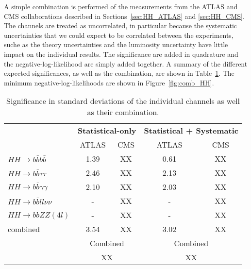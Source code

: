 A simple combination is performed of the measurements from the ATLAS and CMS collaborations described in Sections~\ref{sec:HH_ATLAS} and \ref{sec:HH_CMS}.
The channels are treated as uncorrelated, in particular because the systematic uncertainties that we could expect to be correlated between the experiments, suche as the theory uncertainties and the luminosity uncertainty have little impact on the individual results.
The significance are added in quadrature and the negative-log-likelihood are simply added together. A summary of the different expected significances, as well as the combination, are shown in Table~\ref{tab:comb_significance}. The minimum negative-log-likelihoods are shown in Figure~\ref{fig:comb_HH}.

\begin{table}[htb!]
\begin{center}
\begin{tabular}{lcccc} \toprule
 & \multicolumn{2}{c}{\textbf{Statistical-only}} & \multicolumn{2}{c}{\textbf{Statistical + Systematic}}\\
 & ATLAS & CMS & ATLAS & CMS \\
\hline
$HH \rightarrow b\bar{b}b\bar{b}$ & 1.39 & XX & 0.61 & XX \\
$HH \rightarrow b\bar{b}\tau\tau$ & 2.46 & XX & 2.13 & XX \\
$HH \rightarrow b\bar{b}\gamma\gamma$ & 2.10 & XX & 2.03 & XX \\
$HH \rightarrow b\bar{b}ll\nu\nu$ & - & XX & - & XX \\
$HH \rightarrow b\bar{b}ZZ(4l)$ & - & XX & - & XX \\
combined &  3.54 & XX & 3.02 & XX \\
\hline
 &  \multicolumn{2}{c}{Combined} & \multicolumn{2}{c}{Combined}\\
 &  \multicolumn{2}{c}{XX} & \multicolumn{2}{c}{XX}\\
\bottomrule
\end{tabular}
\end{center}
\caption{Significance in standard deviations of the individual channels as well as their combination.}
\label{tab:comb_significance}
\end{table}




